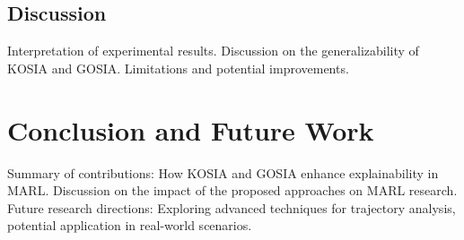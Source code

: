 \documentclass[sn-mathphys-num]{sn-jnl}%
\theoremstyle{thmstyleone}%
\theoremstyle{thmstyletwo}%
\theoremstyle{thmstylethree}%
\begin{document}
    \subsection{Discussion}
        Interpretation of experimental results. Discussion on the generalizability of KOSIA and GOSIA. Limitations and potential improvements.

\section{Conclusion and Future Work}
\label{sec:conclusion}
    Summary of contributions: How KOSIA and GOSIA enhance explainability in MARL. Discussion on the impact of the proposed approaches on MARL research. Future research directions: Exploring advanced techniques for trajectory analysis, potential application in real-world scenarios.

\end{document}
